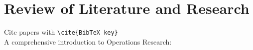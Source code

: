 \chapter{Review of Literature and Research}\label{chapter:Review of Literature and Research}
Cite papers with \verb+\cite{BibTeX key}+\\
A comprehensive introduction to Operations Research: \cite{Winston.2007}